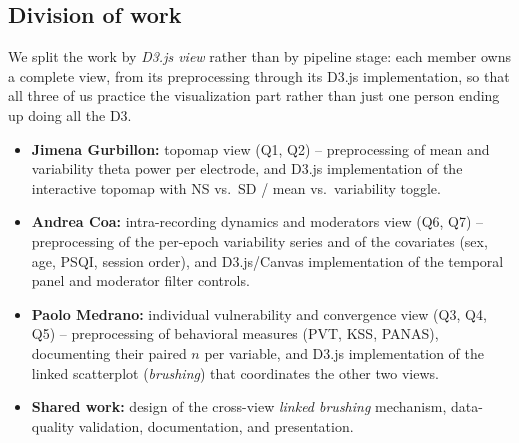 \documentclass[10pt]{article}
\begin{document}
\subsection*{Division of work}
We split the work by \emph{D3.js view} rather than by pipeline stage: each member owns a complete view, from its preprocessing through its D3.js implementation, so that all three of us practice the visualization part rather than just one person ending up doing all the D3.
\begin{itemize}
    \item \textbf{Jimena Gurbillon:} topomap view (Q1, Q2) -- preprocessing of mean and variability theta power per electrode, and D3.js implementation of the interactive topomap with NS vs.\ SD / mean vs.\ variability toggle.
    \item \textbf{Andrea Coa:} intra-recording dynamics and moderators view (Q6, Q7) -- preprocessing of the per-epoch variability series and of the covariates (sex, age, PSQI, session order), and D3.js/Canvas implementation of the temporal panel and moderator filter controls.
    \item \textbf{Paolo Medrano:} individual vulnerability and convergence view (Q3, Q4, Q5) -- preprocessing of behavioral measures (PVT, KSS, PANAS), documenting their paired $n$ per variable, and D3.js implementation of the linked scatterplot (\emph{brushing}) that coordinates the other two views.
    \item \textbf{Shared work:} design of the cross-view \emph{linked brushing} mechanism, data-quality validation, documentation, and presentation.
\end{itemize}
\end{document}
